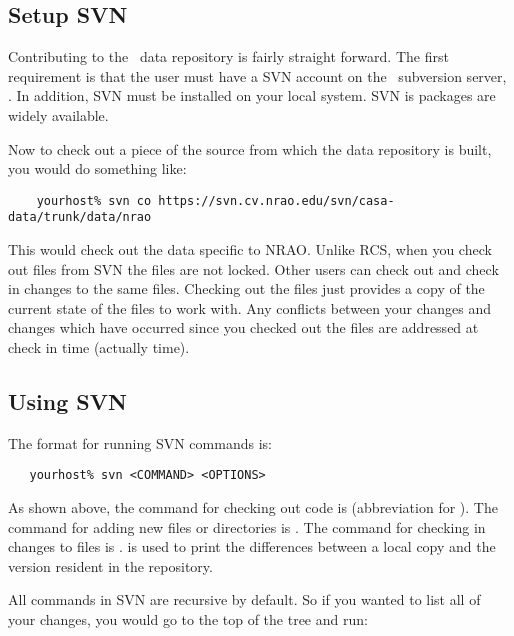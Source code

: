 \subsection*{Setup SVN}
\label{data repository svn setup}

Contributing to the \aipspp\ data repository is fairly straight forward.
The first requirement is that the user must
have a SVN account on the \aipspp\ subversion server, .
In addition, SVN must be installed on your local system. SVN is 
packages are widely available.

Now to check out a piece of the source from which the data repository is
built, you would do something like:

\begin{verbatim}
    yourhost% svn co https://svn.cv.nrao.edu/svn/casa-data/trunk/data/nrao
\end{verbatim}

\noindent
This would check out the data specific to NRAO. Unlike RCS, when you check
out files from SVN the files are not locked. Other users can check out and
check in changes to the same files. Checking out the files just provides
a copy of the current state of the files to work with. Any conflicts
between your changes and changes which have occurred since you checked
out the files are addressed at check in time (actually 
time).

\subsection*{Using SVN}
\label{data repository using svn}

The format for running SVN commands is:

\begin{verbatim}
   yourhost% svn <COMMAND> <OPTIONS>
\end{verbatim}

\noindent
As shown above, the command for checking out code is  (abbreviation
for ). The command for adding new files or directories is
. The command for checking in changes to files is .
 is used to print the differences between a local copy and the
version resident in the repository.

All commands in SVN are recursive by default. So if you wanted to list all
of your changes, you would go to the top of the tree and run:

